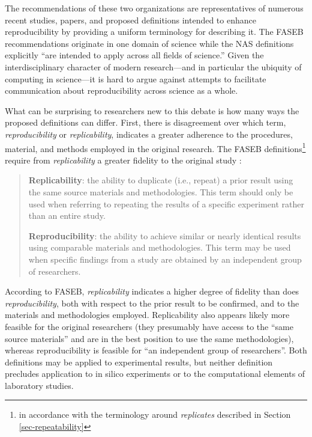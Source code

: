 The recommendations of these two organizations are representatives of numerous recent studies, papers, 
	and proposed definitions intended to enhance reproducibility by providing a uniform terminology
	for describing it.  
The FASEB recommendations originate in one domain of science while the NAS definitions explicitly 
	``are intended to apply across all fields of science.''
Given the interdisciplinary character of modern research---and in particular the ubiquity of computing in science---it 
	is hard to argue against attempts to facilitate communication about reproducibility across science as a whole.

What can be surprising to researchers new to this debate is how many ways the proposed definitions
	can differ.
First, there is disagreement over which term, \emph{reproducibility} or \emph{replicability}, indicates
	 a greater adherence to the procedures, material,  and methods employed in the original research.
The FASEB definitions\footnote{in accordance with the terminology around \emph{replicates} described in Section\,\ref{sec-repeatability}}
	require from \emph{replicability} a greater fidelity to the original study \cite[p.3]{FASEB2016enhancing}:
        \begin{quote}
          \textbf{Replicability}: the ability to duplicate (i.e., repeat) a prior result using the same
          source materials and methodologies. This term should only be used when
	referring to repeating the results of a specific experiment rather than an
	entire study. \medskip

	\textbf{Reproducibility}: the ability to achieve similar or nearly identical results using comparable materials and methodologies.
	This term may be used when specific findings from a study are obtained by an independent group of researchers.
      \end{quote}
According to FASEB, \emph{replicability} indicates a higher degree of fidelity than does \emph{reproducibility}, 
	both with respect to the prior result to be confirmed, and to the materials and methodologies employed.
Replicability also appears likely more feasible for the original researchers (they presumably have access to the 
	``same source materials'' and are in the best position to use the same methodologies), whereas reproducibility is 
	feasible for ``an independent group of researchers''. 
Both definitions may be applied to experimental results, but neither definition precludes application to in silico 
	experiments or to the computational elements of laboratory studies.

